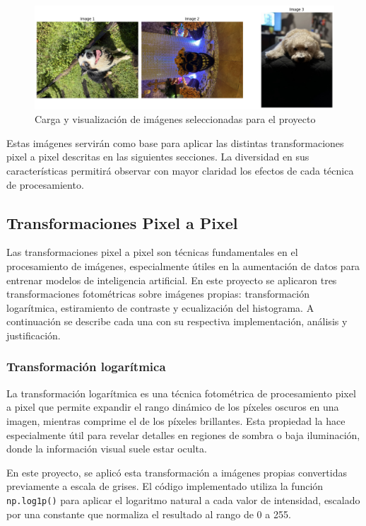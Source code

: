 \documentclass[12pt,letterpaper]{article}
\begin{document}
\begin{figure}[H]
    \centering
    \includegraphics[width=0.9\linewidth]{figuras/carga_imagenes.png}
    \caption{Carga y visualización de imágenes seleccionadas para el proyecto}
    \label{fig:carga_imagenes}
\end{figure}

Estas imágenes servirán como base para aplicar las distintas transformaciones pixel a pixel descritas en las siguientes secciones. La diversidad en sus características permitirá observar con mayor claridad los efectos de cada técnica de procesamiento.

\subsection{Transformaciones Pixel a Pixel}

Las transformaciones pixel a pixel son técnicas fundamentales en el procesamiento de imágenes, especialmente útiles en la aumentación de datos para entrenar modelos de inteligencia artificial. En este proyecto se aplicaron tres transformaciones fotométricas sobre imágenes propias: transformación logarítmica, estiramiento de contraste y ecualización del histograma. A continuación se describe cada una con su respectiva implementación, análisis y justificación.

\subsubsection{Transformación logarítmica}

La transformación logarítmica es una técnica fotométrica de procesamiento pixel a pixel que permite expandir el rango dinámico de los píxeles oscuros en una imagen, mientras comprime el de los píxeles brillantes. Esta propiedad la hace especialmente útil para revelar detalles en regiones de sombra o baja iluminación, donde la información visual suele estar oculta.

En este proyecto, se aplicó esta transformación a imágenes propias convertidas previamente a escala de grises. El código implementado utiliza la función \texttt{np.log1p()} para aplicar el logaritmo natural a cada valor de intensidad, escalado por una constante que normaliza el resultado al rango de 0 a 255.
\end{document}

